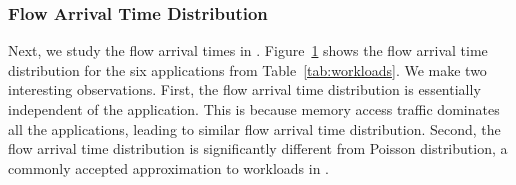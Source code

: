 %
\begin{figure}
  \centering
  \caption{\small{}}
  \label{fig:fat}
\end{figure}
%
\subsubsection{Flow Arrival Time Distribution}
\label{ssec:fatd}
Next, we study the flow arrival times in \dis. Figure~\ref{fig:fat} shows the flow arrival time distribution for the six applications from Table~\ref{tab:workloads}. We make two interesting observations. First, the flow arrival time distribution is essentially independent of the application. This is because memory access traffic dominates all the applications, leading to similar flow arrival time distribution. Second, the flow arrival time distribution is significantly different from Poisson distribution, a commonly accepted approximation to workloads in \pdis. 

